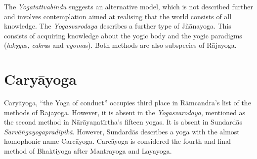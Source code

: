 The \textit{Yogatattvabindu} suggests an alternative model, which is not described further and involves contemplation aimed at realising that the world consists of all knowledge. The \textit{Yogasvarodaya} describes a further type of Jñānayoga. This consists of acquiring knowledge about the yogic body and the yogic paradigms (\textit{lakṣya}s, \textit{cakra}s and \textit{vyoma}s). Both methods are also subspecies of Rājayoga.


\section{Caryāyoga}
\label{caryayogaintro}

Caryāyoga, ``the Yoga of conduct'' occupies third place in Rāmcandra's list of the methods of Rājayoga. However, it is absent in the \textit{Yogasvarodaya}, mentioned as the second method in Nārāyaṇatīrtha's fifteen yogas. It is absent in Sundardās \textit{Sarvāṅgayogapradīpikā}. However, Sundardās describes a yoga with the almost homophonic name Carcāyoga. Carcāyoga is considered the fourth and final method of Bhaktiyoga after Mantrayoga and Layayoga. 

